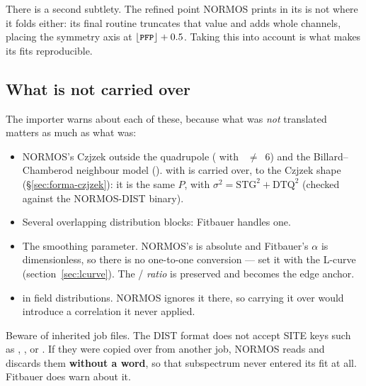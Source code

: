 There is a second subtlety. The refined point NORMOS prints in its 
is not where it folds either: its final routine truncates that value and adds
whole channels, placing the symmetry axis at $\lfloor \texttt{\small PFP} \rfloor + 0.5$.
Taking this into account is what makes its fits reproducible.

\subsection*{What is not carried over}

The importer warns about each of these, because what was \emph{not} translated
matters as much as what was:

\begin{itemize}[nosep]
  \item NORMOS's Czjzek outside the quadrupole ( with
        ~$\neq$~6) and the Billard--Chamberod neighbour model
        ().  with  is carried
        over, to the Czjzek shape (\S\ref{sec:forma-czjzek}): it is the same
        $P$, with $\sigma^2=\mathrm{STG}^2+\mathrm{DTQ}^2$ (checked against the
        NORMOS-DIST binary).
  \item Several overlapping distribution blocks: Fitbauer handles one.
  \item The  smoothing parameter. NORMOS's is absolute and
        Fitbauer's $\alpha$ is dimensionless, so there is no one-to-one
        conversion --- set it with the L-curve (section~\ref{sec:lcurve}). The / \emph{ratio} is preserved and
        becomes the edge anchor.
  \item {} in field distributions. NORMOS ignores it there, so carrying
        it over would introduce a correlation it never applied.
\end{itemize}

\begin{aviso}
Beware of inherited job files. The DIST format does not accept SITE keys such as
, ,  or . If they were copied over from
another job, NORMOS reads and discards them \textbf{without a word}, so that
subspectrum never entered its fit at all. Fitbauer does warn about it.
\end{aviso}
